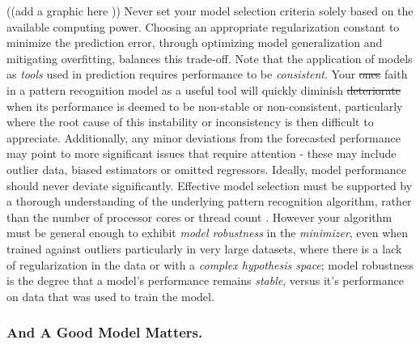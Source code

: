 \documentclass[10pt]{article}[draft]
\begin{document}
  ((add a graphic here ))
 Never set your model selection criteria solely based on the available computing power. Choosing an appropriate regularization constant to minimize the prediction error, through optimizing model generalization and mitigating overfitting, balances this trade-off.  Note that the application of models as \emph{tools} used in prediction requires performance to be \emph{consistent}. Your \st{ones} faith in a pattern recognition model as a useful tool will quickly diminish \st{deteriorate} when its performance is deemed  to be non-stable or non-consistent, particularly where the root cause of this instability or inconsistency is then difficult to appreciate. Additionally, any minor deviations from the forecasted performance may point to more significant issues that require attention - these may include outlier data, biased estimators or omitted regressors. Ideally, model performance should never deviate significantly. Effective model selection must be supported by a thorough understanding of the underlying   pattern recognition algorithm, rather than the number of  processor cores or thread count \cite{hutter2015automated, hastie2009elements, xu2010robustness}. However your algorithm must be general enough to exhibit \emph{model robustness} in the \emph{minimizer}, even when trained against outliers particularly in very large datasets, where there is a lack of regularization in the data or with a \emph{complex hypothesis space}; model robustness is the degree that a model’s performance remains \emph{stable}, versus it's performance on data that was used to train the model.  
  


\subsubsection*{And A Good Model Matters.}
\end{document}
